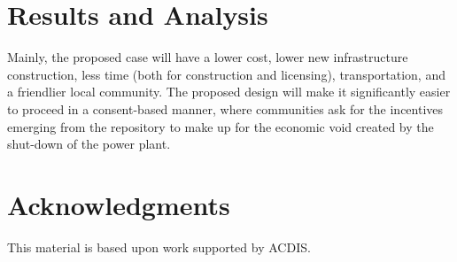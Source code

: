 \documentclass{anstrans}
\begin{document}



\section{Results and Analysis}



Mainly, the proposed case will have a lower cost, lower new infrastructure 
construction, less time (both for construction and licensing), transportation, 
and a friendlier local community. The proposed design will make it 
significantly easier to proceed in a consent-based manner, where communities 
ask for the incentives emerging from the repository to make up for the economic
 void created by the shut-down of the power plant. 


\section{Acknowledgments}

This material is based upon work supported by ACDIS.



\end{document}
